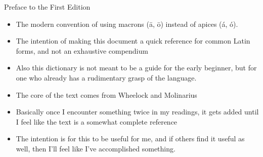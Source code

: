 Preface to the First Edition

\begin{itemize}
  \item The modern convention of using macrons (\=a, \=o)
    instead of apices (\'a, \'o).
  \item The intention of making this document a quick reference
    for common Latin forms, and not an exhaustive compendium
  \item Also this dictionary is not meant to be a guide for the
    early beginner, but for one who already has a rudimentary
    grasp of the language.
  \item The core of the text comes from Wheelock and Molinarius
  \item Basically once I encounter something twice in my readings,
    it gets added until I feel like the text is a somewhat
    complete reference
  \item The intention is for this to be useful for me, and if others
    find it useful as well, then I'll feel like I've accomplished
    something.
\end{itemize}
